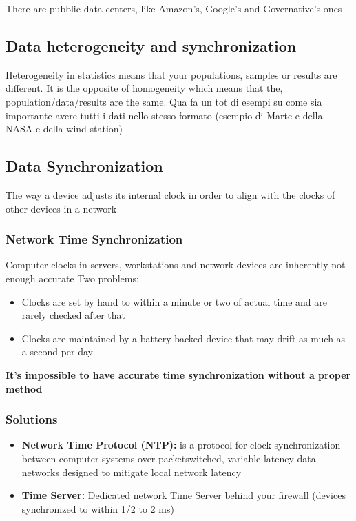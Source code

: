 \documentclass{report}
\begin{document}
\noindent There are pubblic data centers, like Amazon's, Google's and Governative's ones

\subsection{Data heterogeneity and synchronization}
\noindent  Heterogeneity in statistics means that your populations, samples or results are different. It is the opposite of homogeneity which means that the, population/data/results are the same.
Qua fa un tot di esempi  su come sia importante avere tutti i dati nello stesso formato (esempio di Marte e della NASA e della wind station)

\subsection{Data Synchronization}
\noindent The way a device adjusts its internal clock in order to align with the clocks of other devices in a network

\subsubsection{Network Time Synchronization}
Computer clocks in servers, workstations and network devices are inherently not enough accurate
Two problems:
\begin{itemize}
    \item Clocks are set by hand to within a minute or two of actual time and are rarely checked after that 
    \item Clocks are maintained by a battery-backed device that may drift as much as a second per day 
\end{itemize}
\noindent \textbf{It’s impossible to have accurate time synchronization without a proper method}

\subsubsection{Solutions}
\begin{itemize}
    \item \textbf{Network Time Protocol (NTP):} is a protocol for clock synchronization between computer systems over packetswitched, variable-latency data networks designed to mitigate local network latency 
    \item \textbf{Time Server:} Dedicated network Time Server behind your firewall (devices synchronized to within 1/2 to 2 ms)
\end{itemize}
\end{document}
